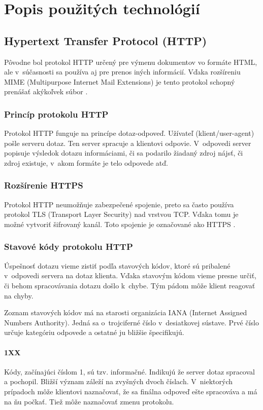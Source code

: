 \documentclass[slovak]{fitthesis}
\begin{document}
\chapter{Popis použitých technológií}\label{technologie}


\section{Hypertext Transfer Protocol (HTTP)}\label{http}
Pôvodne bol protokol HTTP určený pre výmenu dokumentov vo formáte HTML, ale v~súčasnosti sa používa aj pre prenos iných informácií. Vďaka rozšíreniu MIME (Multipurpose Internet Mail Extensions) je tento protokol schopný prenášať akýkoľvek súbor \cite{httpRFC}.

\subsection{Princíp protokolu HTTP}
Protokol HTTP funguje na princípe dotaz-odpoveď. Užívateľ (klient/user-agent) pošle serveru dotaz. Ten server spracuje a klientovi odpovie. V~odpovedi server popisuje výsledok dotazu informáciami, či sa podarilo žiadaný zdroj nájsť, či zdroj existuje, v~akom formáte je telo odpovede atď.


\subsection{Rozšírenie HTTPS}
Protokol HTTP neumožňuje zabezpečené spojenie, preto sa často používa protokol TLS (Transport Layer Security) nad vrstvou TCP. Vďaka tomu je možné vytvoriť šifrovaný kanál. Toto spojenie je označované ako HTTPS \cite{httpsRFC}.


\subsection{Stavové kódy protokolu HTTP}
Úspešnosť dotazu vieme zistiť podľa stavových kódov, ktoré sú pribalené v~odpovedi servera na dotaz klienta. Vďaka stavovým kódom vieme presne určiť, či behom spracovávania dotazu došlo k~chybe. Tým pádom môže klient reagovať na chyby.

Zoznam stavových kódov má na starosti organizácia IANA (Internet Assigned Numbers Authority). Jedná sa o~trojciferné číslo v~desiatkovej sústave. Prvé číslo určuje kategóriu odpovede a ostatné ju bližšie špecifikujú.

\subsubsection{1XX}
Kódy, začínajúci číslom 1, sú tzv. informačné. Indikujú že server dotaz spracoval a pochopil. Bližší význam záleží na zvyšných dvoch číslach. V~niektorých prípadoch môže klientovi naznačovať, že sa finálna odpoveď ešte spracováva a má na ňu počkať. Tiež môže naznačovať zmenu protokolu.
\end{document}
